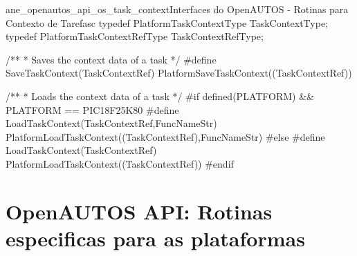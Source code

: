 \begin{algoritmo}{ane_openautos_api_os_task_context}{Interfaces do OpenAUTOS - Rotinas para Contexto de Tarefas}{c}
typedef PlatformTaskContextType TaskContextType;
typedef PlatformTaskContextRefType TaskContextRefType;

/**
* Saves the context data of a task
*/
#define SaveTaskContext(TaskContextRef) PlatformSaveTaskContext((TaskContextRef))

/**
* Loads the context data of a task
*/
#if defined(PLATFORM) &&  PLATFORM == PIC18F25K80
#define LoadTaskContext(TaskContextRef,FuncNameStr) PlatformLoadTaskContext((TaskContextRef),FuncNameStr)
#else
#define LoadTaskContext(TaskContextRef) PlatformLoadTaskContext((TaskContextRef))
#endif
\end{algoritmo}

\chapter{OpenAUTOS API: Rotinas especificas para as plataformas}

